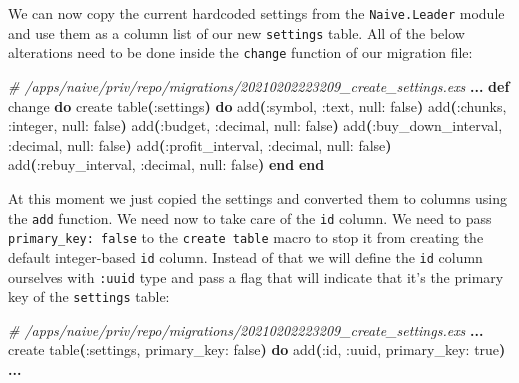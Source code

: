 \documentclass[
  oneside]{book}
\newenvironment{Shaded}{\begin{snugshade}}{\end{snugshade}}
\newcommand{\CommentTok}[1]{\textcolor[rgb]{0.56,0.35,0.01}{\textit{#1}}}
\newcommand{\ConstantTok}[1]{\textcolor[rgb]{0.56,0.35,0.01}{#1}}
\newcommand{\FunctionTok}[1]{\textcolor[rgb]{0.13,0.29,0.53}{\textbf{#1}}}
\newcommand{\KeywordTok}[1]{\textcolor[rgb]{0.13,0.29,0.53}{\textbf{#1}}}
\newcommand{\NormalTok}[1]{#1}
\newcommand{\OperatorTok}[1]{\textcolor[rgb]{0.81,0.36,0.00}{\textbf{#1}}}
\newcommand{\VariableTok}[1]{\textcolor[rgb]{0.00,0.00,0.00}{#1}}
\begin{document}
We can now copy the current hardcoded settings from the \texttt{Naive.Leader} module and use them as a column list of our new \texttt{settings} table. All of the below alterations need to be done inside the \texttt{change} function of our migration file:

\begin{Shaded}
\begin{Highlighting}[]
\CommentTok{\# /apps/naive/priv/repo/migrations/20210202223209\_create\_settings.exs}
\OperatorTok{...}
  \KeywordTok{def}\NormalTok{ change }\KeywordTok{do}
\NormalTok{    create table}\FunctionTok{(}\VariableTok{:settings}\FunctionTok{)} \KeywordTok{do}
\NormalTok{      add}\FunctionTok{(}\VariableTok{:symbol}\NormalTok{, }\VariableTok{:text}\NormalTok{, }\VariableTok{null:} \ConstantTok{false}\FunctionTok{)}
\NormalTok{      add}\FunctionTok{(}\VariableTok{:chunks}\NormalTok{, }\VariableTok{:integer}\NormalTok{, }\VariableTok{null:} \ConstantTok{false}\FunctionTok{)}
\NormalTok{      add}\FunctionTok{(}\VariableTok{:budget}\NormalTok{, }\VariableTok{:decimal}\NormalTok{, }\VariableTok{null:} \ConstantTok{false}\FunctionTok{)}
\NormalTok{      add}\FunctionTok{(}\VariableTok{:buy\_down\_interval}\NormalTok{, }\VariableTok{:decimal}\NormalTok{, }\VariableTok{null:} \ConstantTok{false}\FunctionTok{)}
\NormalTok{      add}\FunctionTok{(}\VariableTok{:profit\_interval}\NormalTok{, }\VariableTok{:decimal}\NormalTok{, }\VariableTok{null:} \ConstantTok{false}\FunctionTok{)}
\NormalTok{      add}\FunctionTok{(}\VariableTok{:rebuy\_interval}\NormalTok{, }\VariableTok{:decimal}\NormalTok{, }\VariableTok{null:} \ConstantTok{false}\FunctionTok{)}
    \KeywordTok{end}
  \KeywordTok{end}
\end{Highlighting}
\end{Shaded}

At this moment we just copied the settings and converted them to columns using the \texttt{add} function. We need now to take care of the \texttt{id} column. We need to pass \texttt{primary\_key:\ false} to the \texttt{create\ table} macro to stop it from creating the default integer-based \texttt{id} column. Instead of that we will define the \texttt{id} column ourselves with \texttt{:uuid} type and pass a flag that will indicate that it's the primary key of the \texttt{settings} table:

\begin{Shaded}
\begin{Highlighting}[]
\CommentTok{\# /apps/naive/priv/repo/migrations/20210202223209\_create\_settings.exs}
\OperatorTok{...}
\NormalTok{    create table}\FunctionTok{(}\VariableTok{:settings}\NormalTok{, }\VariableTok{primary\_key:} \ConstantTok{false}\FunctionTok{)} \KeywordTok{do}
\NormalTok{      add}\FunctionTok{(}\VariableTok{:id}\NormalTok{, }\VariableTok{:uuid}\NormalTok{, }\VariableTok{primary\_key:} \ConstantTok{true}\FunctionTok{)}
      \OperatorTok{...}
\end{Highlighting}
\end{Shaded}
\end{document}
